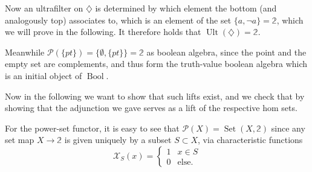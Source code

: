 \documentclass[12pt,a4paper]{article}
\DeclareMathOperator{\Set}{Set}
\DeclareMathOperator{\Bool}{Bool}
\DeclareMathOperator{\Ult}{Ult}
\begin{document}
Now  an ultrafilter on $\diamondsuit$ is determined by which element the bottom (and analogously top) associates to, which is an element of the set $\{a, \neg a\}= \mathbb{2}$, which we will prove in the following. It  therefore holds that  $\Ult(\diamondsuit) = \mathbb{2}$.

Meanwhile $\mathcal{P}(\{pt\}) = \{\emptyset, \{pt\}\} = \mathbb{2}$ as boolean algebra, since the point and the empty set are complements, and thus form the truth-value boolean algebra which is an initial object of $\Bool$. 

 Now in the following we want to show that such lifts exist, and we check that by showing that the adjunction we gave serves as a lift of the respective hom sets. 
 
For the power-set functor, it is easy to see that $\mathcal{P}(X) = \Set(X, \mathbb{2}) $ since any set map  $X \to \mathbb{2}$ is given uniquely by a subset $ S \subset X$, via characteristic functions \begin{equation*}
  \mathcal{X}_{ S}(x) = \begin{cases}
   1 & x \in  S \\
    0 & \text{else}.
  \end{cases}
\end{equation*}
\end{document}
